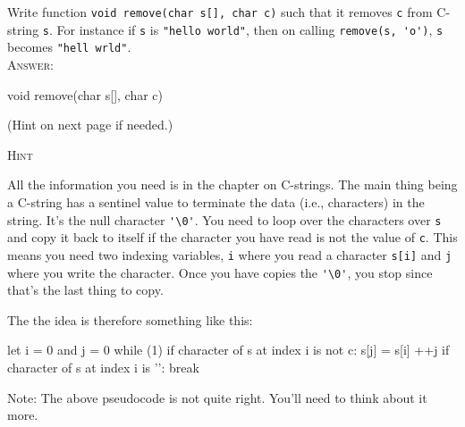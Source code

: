 

\renewcommand\AUTHOR{jdoe5@cougars.ccis.edu} %


\topmattertwo

\nextq
Write function 
\verb!void remove(char s[], char c)!
such that it removes \verb!c! from C-string \verb!s!.
For instance if \verb!s! is \verb!"hello world"!,
then on calling \verb!remove(s, 'o')!,
\verb!s! becomes \verb!"hell wrld"!.
\\
\textsc{Answer:}\vspace{-2mm}
\begin{answercode}
void remove(char s[], char c)
{
}
\end{answercode}
(Hint on next page if needed.)

\newpage
\textsc{Hint}

All the information you need is in the chapter on C-strings.
The main thing being a C-string has a sentinel value to terminate
the data (i.e., characters) in the string.
It's the null character \verb!'\0'!.
You need to loop over the characters over \verb!s!
and copy it back to itself if the character you have read is not
the value of \verb!c!.
This means you need two indexing variables,
\verb!i! where you read a character \verb!s[i]!
and \verb!j! where you write the character.
Once you have copies the \verb!'\0'!, you stop since that's the last
thing to copy.

The the idea is therefore something like this:
\begin{console}[frame=single,fontsize]
let i = 0 and j = 0
while (1)
    if character of s at index i is not c:
        s[j] = s[i]
        ++j
    if character of s at index i is '\0':
        break
\end{console}
Note: The above pseudocode is not quite right.
You'll need to think about it more.

%
